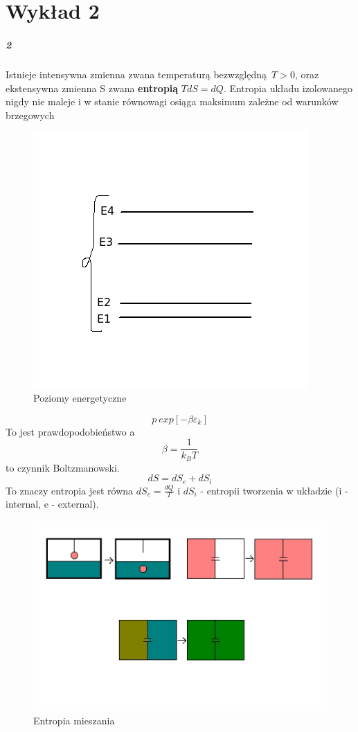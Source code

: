 \documentclass{article}
\begin{document}
	\section{Wykład 2}
			\subparagraph{2} Istnieje intensywna zmienna zwana temperaturą bezwzględną $T > 0$, oraz ekstensywna zmienna S zwana \textbf{entropią} $TdS = dQ$. Entropia układu izolowanego nigdy nie maleje i w stanie równowagi osiąga maksimum zależne od warunków brzegowych
			\begin{figure}[ht]
				\label{fig:fig1}
				\centering
				\includegraphics[scale=0.4]{poziomyenergetyczne.jpeg}
				\caption{Poziomy energetyczne}
			\end{figure}
			$$p ~ exp[-\beta\varepsilon_k]$$	
			To jest prawdopodobieństwo a 
			$$\beta = \frac{1}{k_BT}$$
			to czynnik Boltzmanowski.
			$$dS = dS_e + dS_i$$
			To znaczy entropia jest równa $dS_e = \frac{dQ}{T}$ i $dS_i$ - entropii tworzenia w układzie (i - internal, e - external).
			\begin{figure}[ht]
				\label{fig:fig1}
				\centering
				\includegraphics[scale=0.6]{entropiamieszania.jpeg}
				\caption{Entropia mieszania}
			\end{figure}		
\end{document}
